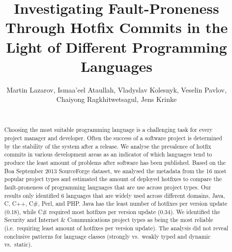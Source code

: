 \documentclass{sig-alternate}
\newcommand\FIXME[1]{\textbf{FIXME: #1}}
\begin{document}
\title{Investigating Fault-Proneness Through Hotfix Commits in the Light of Different Programming Languages}
\author{
  Martin Lazarov, Ismaa'eel Ataullah, Vladyslav Kolesnyk, Veselin Pavlov,\\ Chaiyong Ragkhitwetsagul, Jens Krinke\\
  \\
}

\maketitle

\begin{abstract}
Choosing the most suitable programming language is a challenging task for every project manager and developer. Often the success of a software project is determined by the stability of the system after a release. We analyse the prevalence of hotfix commits in various development areas as an indicator of which languages tend to produce the least amount of problems after software has been published. Based on the Boa September 2013 SourceForge dataset, we analysed the metadata from the 16 most popular project types and estimated the amount of deployed hotfixes to compare the fault-proneness of programming languages that are use across project types. Our results only identified 6 languages that are widely used across different domains, Java, C, C++, C\#, Perl, and PHP. Java has the least number of hotfixes per version update (0.18), while C\# required most hotfixes per version update (0.34). We identified the Security and Internet \& Communications project types as being the most reliable (i.e.\ requiring least amount of hotfixes per version update). The analysis did not reveal conclusive patterns for language classes (strongly vs.\ weakly typed and dynamic vs.\ static).
\end{abstract}



\end{document}
